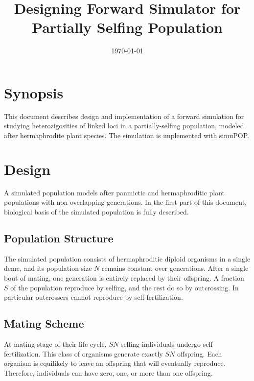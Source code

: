\documentclass[12pt]{article}
\begin{document}
\title{Designing Forward Simulator for Partially Selfing Population}
\date{\today}
\maketitle

\section{Synopsis}
\label{sec:synopsis}

This document describes design and implementation of a forward
simulation for studying heterozigosities of linked loci in a
partially-selfing population, modeled after hermaphrodite plant
species.
The simulation is implemented with simuPOP.

\section{Design}
\label{sec:design}

A simulated population models after panmictic and hermaphroditic plant
populations with non-overlapping generations.
In the first part of this document, biological basis of the simulated
population is fully described.

\subsection{Population Structure}
\label{sec:population-structure}

The simulated population consists of hermaphroditic diploid organisms
in a single deme, and its population size \(N\) remains constant
over generations.
After a single bout of mating, one generation is entirely replaced by
their offspring.
A fraction \(S\) of the population reproduce by selfing,
and the rest do so by outcrossing.
In particular outcrossers cannot reproduce by self-fertilization.

\subsection{Mating Scheme}
\label{sec:mating-scheme}

At mating stage of their life cycle,
\(S N\) selfing individuals undergo self-fertilization.
This class of organisms generate exactly \(S N\) offspring.
Each organism is equilikely to leave an offspring that will eventually
reproduce.
Therefore, individuals can have zero, one, or more than one offspring.
\end{document}
